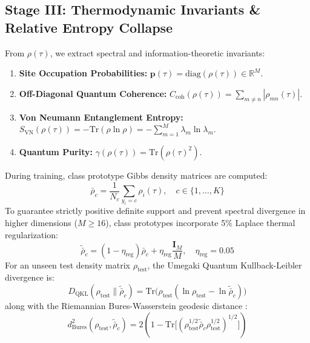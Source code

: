 \documentclass[journal,twocolumn,10pt]{IEEEtran}
\begin{document}
\subsection{Stage III: Thermodynamic Invariants \& Relative Entropy Collapse}
From $\rho(\tau)$, we extract spectral and information-theoretic invariants:
\begin{enumerate}
    \item \textbf{Site Occupation Probabilities:} $\mathbf{p}(\tau) = \mathrm{diag}(\rho(\tau)) \in \mathbb{R}^M$.
    \item \textbf{Off-Diagonal Quantum Coherence:} $C_{\text{coh}}(\rho(\tau)) = \sum_{m \neq n} |\rho_{mn}(\tau)|$.
    \item \textbf{Von Neumann Entanglement Entropy:} $S_{\text{VN}}(\rho(\tau)) = -\mathrm{Tr}(\rho \ln \rho) = -\sum_{m=1}^M \lambda_m \ln \lambda_m$.
    \item \textbf{Quantum Purity:} $\gamma(\rho(\tau)) = \mathrm{Tr}(\rho(\tau)^2)$.
\end{enumerate}

During training, class prototype Gibbs density matrices are computed:
\begin{equation}
\bar{\rho}_c = \frac{1}{N_c} \sum_{y_i = c} \rho_i(\tau), \quad c \in \{1, \dots, K\}
\end{equation}
To guarantee strictly positive definite support and prevent spectral divergence in higher dimensions ($M \ge 16$), class prototypes incorporate 5\% Laplace thermal regularization:
\begin{equation}
\tilde{\bar{\rho}}_c = (1 - \eta_{\mathrm{reg}}) \bar{\rho}_c + \eta_{\mathrm{reg}} \frac{\mathbf{I}_M}{M}, \quad \eta_{\mathrm{reg}} = 0.05
\end{equation}
For an unseen test density matrix $\rho_{\text{test}}$, the Umegaki Quantum Kullback-Leibler divergence is:
\begin{equation}
D_{\text{QKL}}(\rho_{\text{test}} \parallel \tilde{\bar{\rho}}_c) = \mathrm{Tr}\Big( \rho_{\text{test}} (\ln \rho_{\text{test}} - \ln \tilde{\bar{\rho}}_c) \Big)
\end{equation}
along with the Riemannian Bures-Wasserstein geodesic distance \cite{bures1969extension,baryshnikov2011bures,braunstein1994statistical,petz1996monotone}:
\begin{equation}
d_{\text{Bures}}^2(\rho_{\text{test}}, \tilde{\bar{\rho}}_c) = 2\left( 1 - \mathrm{Tr}\Big[ (\rho_{\text{test}}^{1/2} \tilde{\bar{\rho}}_c \rho_{\text{test}}^{1/2})^{1/2} \Big] \right)
\end{equation}
\end{document}
